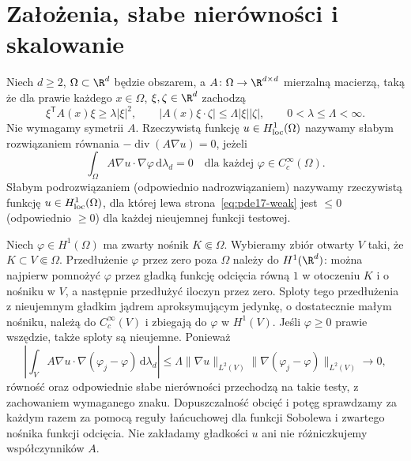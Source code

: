 \section{Założenia, słabe nierówności i skalowanie}
\label{sec:pde17-assumptions}
\begin{definicja}
Niech $d\ge2$, $\Omega\subset\R^d$ będzie obszarem, a
$A\colon\Omega\to\R^{d\times d}$ mierzalną macierzą, taką że dla
prawie każdego $x\in\Omega$, $\xi,\zeta\in\R^d$ zachodzą
\begin{equation}\label{eq:pde17-ellipticity}
 \xi^{\mathsf T}A(x)\xi\ge\lambda|\xi|^2,
 \qquad |A(x)\xi\cdot\zeta|\le\Lambda|\xi||\zeta|,
 \qquad 0<\lambda\le\Lambda<\infty.
\end{equation}
Nie wymagamy symetrii $A$. Rzeczywistą funkcję
$u\in H^1_{\rm loc}(\Omega)$
nazywamy słabym rozwiązaniem równania
$-\operatorname{div}(A\nabla u)=0$, jeżeli
\begin{equation}\label{eq:pde17-weak}
 \int_\Omega A\nabla u\cdot\nabla\varphi\,\mathrm d\lambda_d=0
 \quad\text{dla każdej }\varphi\in C_c^\infty(\Omega).
\end{equation}
Słabym podrozwiązaniem (odpowiednio nadrozwiązaniem)
nazywamy rzeczywistą funkcję $u\in H^1_{\rm loc}(\Omega)$,
dla której lewa strona~\eqref{eq:pde17-weak} jest $\le0$
(odpowiednio $\ge0$) dla każdej nieujemnej funkcji testowej.
\end{definicja}

\begin{uwaga}
Niech $\varphi\in H^1(\Omega)$ ma zwarty nośnik $K\Subset\Omega$.
Wybieramy zbiór otwarty $V$ taki, że $K\subset V\Subset\Omega$.
Przedłużenie $\varphi$ przez zero poza $\Omega$ należy do
$H^1(\R^d)$: można najpierw pomnożyć $\varphi$ przez gładką
funkcję odcięcia równą $1$ w otoczeniu $K$ i o nośniku w $V$,
a następnie przedłużyć iloczyn przez zero.
Sploty tego przedłużenia z nieujemnym gładkim jądrem
aproksymującym jedynkę, o dostatecznie małym nośniku, należą
do $C_c^\infty(V)$ i zbiegają do $\varphi$ w $H^1(V)$.
Jeśli $\varphi\ge0$ prawie wszędzie, także sploty są nieujemne.
Ponieważ
\[
 \left|\int_V A\nabla u\cdot\nabla(\varphi_j-\varphi)\,
 \mathrm d\lambda_d\right|
 \le\Lambda\|\nabla u\|_{L^2(V)}
       \|\nabla(\varphi_j-\varphi)\|_{L^2(V)}\longrightarrow0,
\]
równość oraz odpowiednie słabe nierówności przechodzą na takie
testy, z zachowaniem wymaganego znaku.
Dopuszczalność obcięć i potęg sprawdzamy za każdym razem za
pomocą reguły łańcuchowej dla funkcji Sobolewa i zwartego
nośnika funkcji odcięcia. Nie zakładamy gładkości $u$
ani nie różniczkujemy współczynników $A$.
\end{uwaga}


